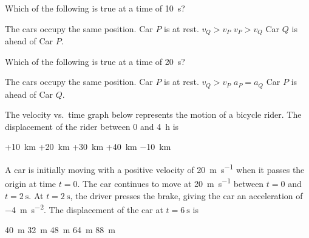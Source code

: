 \documentclass{../../../oss-ap12ibhl}
\begin{document}
\begin{questions}
  \question\vspace{-.15in}Which of the following is true at a time of
  \SI{10}{\second}?
  \begin{choices}
    \choice The cars occupy the same position.
    \choice Car $P$ is at rest.
    \choice $v_Q>v_P$
    \choice $v_P>v_Q$
    \choice Car $Q$ is ahead of Car $P$.
  \end{choices}
  \label{q:graph1}
    
  \question Which of the following is true at a time of \SI{20}{\second}?
  \begin{choices}
    \choice The cars occupy the same position.
    \choice Car $P$ is at rest.
    \choice $v_Q>v_P$
    \choice $a_P=a_Q$
    \choice Car $P$ is ahead of Car $Q$.
  \end{choices}
  \label{q:graph2}

  \uplevel{\rule{\linewidth}{.6pt}}
  
  \question The velocity vs.\ time graph below represents the motion of a
  bicycle rider. The displacement of the rider between $0$ and \SI{4}{\hour} is

  \begin{minipage}{.4\linewidth}
  \end{minipage}
  \begin{minipage}{.4\linewidth}
    \begin{choices}
      \choice +\SI{10}{\kilo\metre}
      \choice +\SI{20}{\kilo\metre}
      \choice +\SI{30}{\kilo\metre}
      \choice +\SI{40}{\kilo\metre}
      \choice \SI{-10}{\kilo\metre}
    \end{choices}
  \end{minipage}
  
  \uplevel{\rule{\linewidth}{.6pt}}
  
  \question A car is initially moving with a positive velocity of
  \SI{20}{\metre\per\second} when it passes the origin at time $t=0$. The car
  continues to move at \SI{20}{\metre\per\second} between $t=0$ and
  $t=\SI{2}{\second}$. At $t=\SI{2}{\second}$, the driver presses the brake,
  giving the car an acceleration of \SI{-4}{\metre\per\second\squared}. The
  displacement of the car at $t=\SI{6}{\second}$ is

  \begin{oneparchoices}
    \choice\SI{40}{\metre}\hspace{.28in}
    \choice\SI{32}{\metre}\hspace{.28in}
    \choice\SI{48}{\metre}\hspace{.28in}
    \choice\SI{64}{\metre}\hspace{.28in}
    \choice\SI{88}{\metre}
  \end{oneparchoices}


\end{questions}
\end{document}
